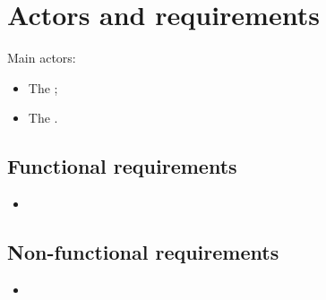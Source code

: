 \chapter{Actors and requirements}

Main actors:
\begin{itemize}
	\item The ;
	\item The .
\end{itemize}

\section{Functional requirements}

\begin{itemize}
	\item \textellipsis
\end{itemize}

\section{Non-functional requirements}

\begin{itemize}
	\item \textellipsis
\end{itemize}
